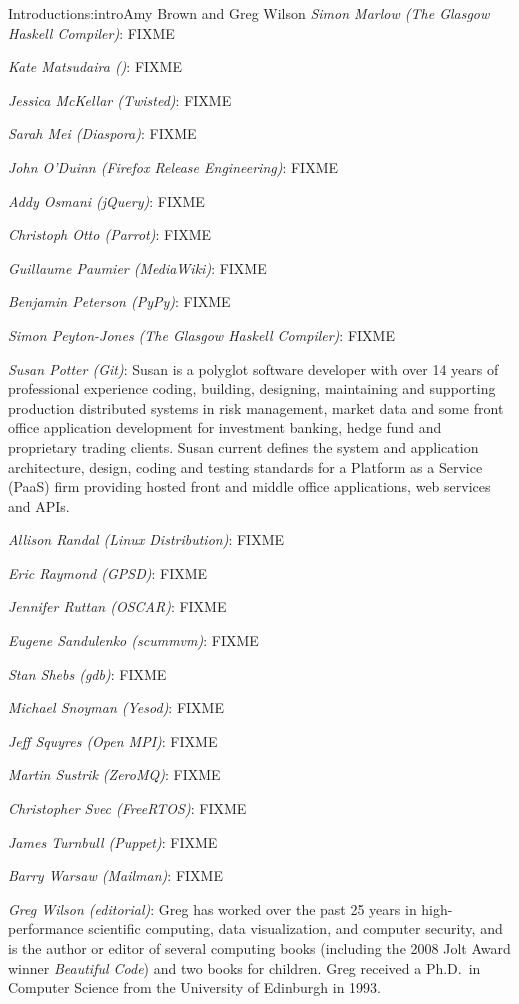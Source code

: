 \begin{aosachapter}{Introduction}{s:intro}{Amy Brown and Greg Wilson}
\emph{Simon Marlow (The Glasgow Haskell Compiler)}: FIXME

\emph{Kate Matsudaira ()}: FIXME

\emph{Jessica McKellar (Twisted)}: FIXME

\emph{Sarah Mei (Diaspora)}: FIXME

\emph{John O'Duinn (Firefox Release Engineering)}: FIXME

\emph{Addy Osmani (jQuery)}: FIXME

\emph{Christoph Otto (Parrot)}: FIXME

\emph{Guillaume Paumier (MediaWiki)}: FIXME

\emph{Benjamin Peterson (PyPy)}: FIXME

\emph{Simon Peyton-Jones (The Glasgow Haskell Compiler)}: FIXME

\emph{Susan Potter (Git)}: Susan is a polyglot software developer with
over 14 years of professional experience coding, building, designing,
maintaining and supporting production distributed systems in risk management,
market data and some front office application development for investment
banking, hedge fund and proprietary trading clients. Susan current defines the
system and application architecture, design, coding and testing standards for
a Platform as a Service (PaaS) firm providing hosted front and middle office
applications, web services and APIs.

\emph{Allison Randal (Linux Distribution)}: FIXME

\emph{Eric Raymond (GPSD)}: FIXME

\emph{Jennifer Ruttan (OSCAR)}: FIXME

\emph{Eugene Sandulenko (scummvm)}: FIXME

\emph{Stan Shebs (gdb)}: FIXME

\emph{Michael Snoyman (Yesod)}: FIXME

\emph{Jeff Squyres (Open MPI)}: FIXME

\emph{Martin Sustrik (ZeroMQ)}: FIXME

\emph{Christopher Svec (FreeRTOS)}: FIXME

\emph{James Turnbull (Puppet)}: FIXME

\emph{Barry Warsaw (Mailman)}: FIXME

\emph{Greg Wilson (editorial)}: Greg has worked over the past 25 years
in high-performance scientific computing, data visualization, and
computer security, and is the author or editor of several computing
books (including the 2008 Jolt Award winner \emph{Beautiful Code}) and
two books for children.  Greg received a Ph.D.\ in Computer Science
from the University of Edinburgh in 1993.


\end{aosachapter}
